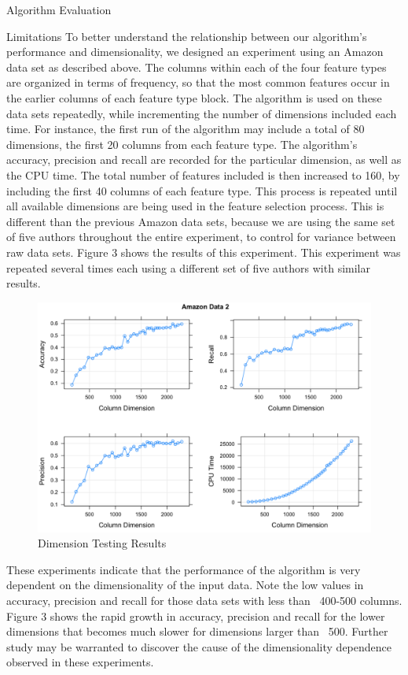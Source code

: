 \documentclass{llncs}
\begin{document}
\begin{section}{Algorithm Evaluation}
\begin{subsection}{Limitations}
To better understand the relationship between our algorithm's performance and dimensionality, we designed an experiment using an Amazon data set as described above. The columns within each of the four feature types are organized in terms of frequency, so that the most common features occur in the earlier columns of each feature type block. The algorithm is used on these data sets repeatedly, while incrementing the number of dimensions included each time. For instance, the first run of the algorithm may include a total of 80 dimensions, the first 20 columns from each feature type. The algorithm's accuracy, precision and recall are recorded for the particular dimension, as well as the CPU time. The total number of features included is then increased to 160, by including the first 40 columns of each feature type. This process is repeated until all available dimensions are being used in the feature selection process. This is different than the previous Amazon data sets, because we are using the same set of five authors throughout the entire experiment, to control for variance between raw data sets. Figure 3 shows the results of this experiment. This experiment was repeated several times each using a different set of five authors with similar results.
\begin{figure}[h]
\begin{center}
\includegraphics[scale = .4]{figures/amazon2}
\caption{Dimension Testing Results}
\end{center}
\label{fig:dimtests}
\end{figure}

These experiments indicate that the performance of the algorithm is very dependent on the dimensionality of the input data. Note the low values in accuracy, precision and recall for those data sets with less than ~400-500 columns. Figure 3 shows the rapid growth in accuracy, precision and recall for the lower dimensions that  becomes much slower for dimensions larger than ~500. Further study may be warranted to discover the cause of the dimensionality dependence observed in these experiments.



\end{subsection}
\end{section}
\end{document}
